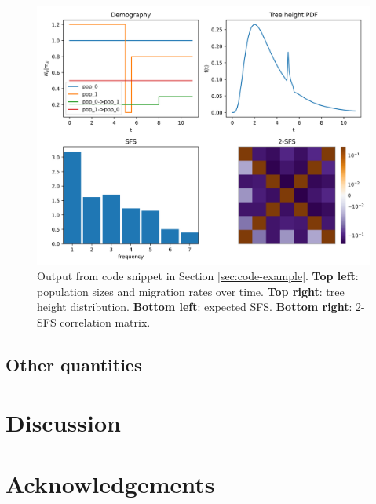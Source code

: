 \documentclass[hidelinks,11pt]{article}
\begin{document}
    \begin{figure}[H]
        \centering
        \includegraphics[width=\textwidth]{figures/manuscript_example}
        \caption{Output from code snippet in Section \ref{sec:code-example}. \textbf{Top left}: population sizes and migration rates over time. \textbf{Top right}: tree height distribution. \textbf{Bottom left}: expected SFS. \textbf{Bottom right}: 2-SFS correlation matrix.}
        \label{fig:simple-example}
    \end{figure}

    \subsection{Other quantities}\label{subsec:other-quantities}


    \section{Discussion}\label{sec:discussion}

    \section*{Acknowledgements}

    \newpage
    

    \newpage
    \appendix
    
\end{document}
